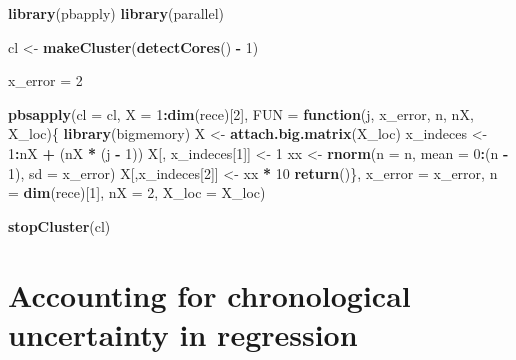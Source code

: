 \documentclass[]{article}
\newenvironment{Shaded}{\begin{snugshade}}{\end{snugshade}}
\newcommand{\KeywordTok}[1]{\textcolor[rgb]{0.13,0.29,0.53}{\textbf{#1}}}
\newcommand{\DataTypeTok}[1]{\textcolor[rgb]{0.13,0.29,0.53}{#1}}
\newcommand{\DecValTok}[1]{\textcolor[rgb]{0.00,0.00,0.81}{#1}}
\newcommand{\StringTok}[1]{\textcolor[rgb]{0.31,0.60,0.02}{#1}}
\newcommand{\ControlFlowTok}[1]{\textcolor[rgb]{0.13,0.29,0.53}{\textbf{#1}}}
\newcommand{\OperatorTok}[1]{\textcolor[rgb]{0.81,0.36,0.00}{\textbf{#1}}}
\newcommand{\NormalTok}[1]{#1}
\begin{document}
\begin{Shaded}
\begin{Highlighting}[]
\KeywordTok{library}\NormalTok{(pbapply)}
\KeywordTok{library}\NormalTok{(parallel)}

\NormalTok{cl <-}\StringTok{ }\KeywordTok{makeCluster}\NormalTok{(}\KeywordTok{detectCores}\NormalTok{() }\OperatorTok{-}\StringTok{ }\DecValTok{1}\NormalTok{)}

\NormalTok{x_error =}\StringTok{ }\DecValTok{2}

\KeywordTok{pbsapply}\NormalTok{(}\DataTypeTok{cl =}\NormalTok{ cl,}
        \DataTypeTok{X =} \DecValTok{1}\OperatorTok{:}\KeywordTok{dim}\NormalTok{(rece)[}\DecValTok{2}\NormalTok{],}
        \DataTypeTok{FUN =} \ControlFlowTok{function}\NormalTok{(j,}
\NormalTok{                    x_error,}
\NormalTok{                    n,}
\NormalTok{                    nX,}
\NormalTok{                    X_loc)\{}
                \KeywordTok{library}\NormalTok{(bigmemory)}
\NormalTok{                X <-}\StringTok{ }\KeywordTok{attach.big.matrix}\NormalTok{(X_loc)}
\NormalTok{                x_indeces <-}\StringTok{ }\DecValTok{1}\OperatorTok{:}\NormalTok{nX }\OperatorTok{+}\StringTok{ }\NormalTok{(nX }\OperatorTok{*}\StringTok{ }\NormalTok{(j }\OperatorTok{-}\StringTok{ }\DecValTok{1}\NormalTok{))}
\NormalTok{                X[, x_indeces[}\DecValTok{1}\NormalTok{]] <-}\StringTok{ }\DecValTok{1}
\NormalTok{                xx <-}\StringTok{ }\KeywordTok{rnorm}\NormalTok{(}\DataTypeTok{n =}\NormalTok{ n,}
                            \DataTypeTok{mean =} \DecValTok{0}\OperatorTok{:}\NormalTok{(n }\OperatorTok{-}\StringTok{ }\DecValTok{1}\NormalTok{),}
                            \DataTypeTok{sd =}\NormalTok{ x_error)}
\NormalTok{                X[,x_indeces[}\DecValTok{2}\NormalTok{]] <-}\StringTok{ }\NormalTok{xx }\OperatorTok{*}\StringTok{ }\DecValTok{10}
                \KeywordTok{return}\NormalTok{()\},}
        \DataTypeTok{x_error =}\NormalTok{ x_error,}
        \DataTypeTok{n =} \KeywordTok{dim}\NormalTok{(rece)[}\DecValTok{1}\NormalTok{],}
        \DataTypeTok{nX =} \DecValTok{2}\NormalTok{,}
        \DataTypeTok{X_loc =}\NormalTok{ X_loc)}

\KeywordTok{stopCluster}\NormalTok{(cl)}
\end{Highlighting}
\end{Shaded}

\section{Accounting for chronological uncertainty in
regression}\label{accounting-for-chronological-uncertainty-in-regression}
\end{document}
